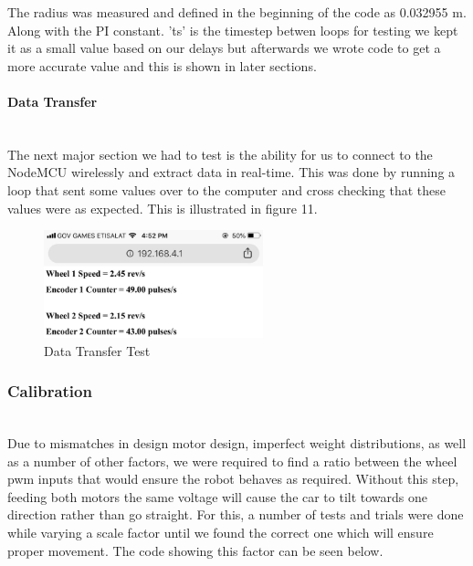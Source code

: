 \documentclass[conference]{IEEEtran}
\begin{document}
    The radius was measured and defined in the beginning of the code as 0.032955 m. Along
    with the PI constant. 'ts' is the timestep betwen loops for testing we kept it as a small
    value based on our delays but afterwards we wrote code to get a more accurate value and
    this is shown in later sections.\\

    \paragraph{Data Transfer}

    ~~\\The next major section we had to test is the ability for us to connect to the
    NodeMCU wirelessly and extract data in real-time. This was done by running a
    loop that sent some values over to the computer and cross checking that these
    values were as expected. This is illustrated in figure 11.

    \begin{figure}[H]
        \centering
        \captionsetup{justification=centering}
        \centering
        \includegraphics[width=2.5in]{11.png}
        \caption{Data Transfer Test}  
        \label{6}
    \end{figure}

    \subsubsection{Calibration}

    ~~\\Due to mismatches in design motor design, imperfect weight distributions,
    as well as a number of other factors, we were required to find a ratio between
    the wheel pwm inputs that would ensure the robot behaves as required. Without
    this step, feeding both motors the same voltage will cause the car to tilt
    towards one direction rather than go straight. For this, a number of tests and
    trials were done while varying a scale factor until we found the correct one
    which will ensure proper movement. The code showing this factor can be seen below.
\end{document}
